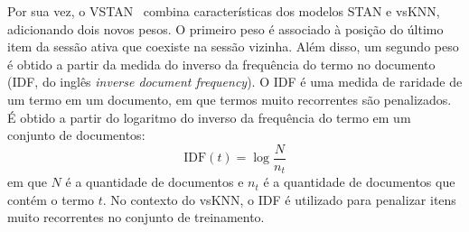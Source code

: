 Por sua vez, o VSTAN~\cite{ludewig_2021} combina características dos modelos STAN e vsKNN,
adicionando dois novos pesos. O primeiro peso é associado à posição do último
item da sessão ativa que coexiste na sessão vizinha. Além disso, um segundo peso
é obtido a partir da medida do inverso da frequência do termo no documento (IDF,
do inglês \textit{inverse document frequency}). O IDF é uma medida de raridade
de um termo em um documento, em que termos muito recorrentes são penalizados.
É obtido a partir do logaritmo do inverso da frequência do termo em um
conjunto de documentos:
\begin{equation}
    \text{IDF}(t) = \log \frac{N}{n_t}
\end{equation}
em que $N$ é a quantidade de documentos e $n_t$ é a quantidade de documentos
que contém o termo $t$. No contexto do vsKNN, o IDF é utilizado para penalizar
itens muito recorrentes no conjunto de treinamento.
